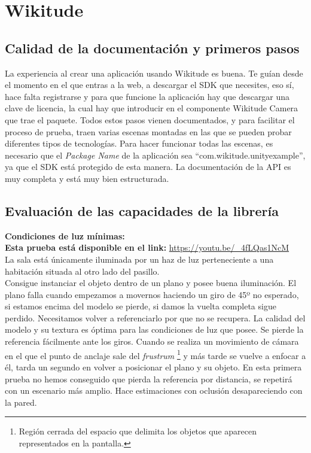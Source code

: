 \clearpage
\section{Wikitude}

\subsection{Calidad de la documentación y primeros pasos}
La experiencia al crear una aplicación usando Wikitude es buena. Te guían desde el momento en el que entras a la web, a descargar el SDK que necesites, eso sí, hace falta registrarse y para que funcione la aplicación hay que descargar una clave de licencia, la cual hay que introducir en el componente Wikitude Camera que trae el paquete. Todos estos pasos vienen documentados, y para facilitar el proceso de prueba, traen varias escenas montadas en las que se pueden probar diferentes tipos de tecnologías. Para hacer funcionar todas las escenas, es necesario que el \textit{Package Name} de la aplicación sea ``com.wikitude.unityexample'', ya que el SDK está protegido de esta manera. La documentación de la API es muy completa y está muy bien estructurada.\cite{WikitudeDoc}
\subsection{Evaluación de las capacidades de la librería}
\textbf{Condiciones de luz mínimas:}\\
\textbf{Esta prueba está disponible en el link:} \url{https://youtu.be/_4fLQas1NcM}\\

La sala está únicamente iluminada por un haz de luz perteneciente a una habitación situada al otro lado del pasillo.\\

Consigue instanciar el objeto dentro de un plano y posee buena iluminación. El plano falla cuando empezamos a movernos haciendo un giro de 45º no esperado, si estamos encima del modelo se pierde, si damos la vuelta completa sigue perdido. Necesitamos volver a referenciarlo por que no se recupera. La calidad del modelo y su textura es óptima para las condiciones de luz que posee. Se pierde la referencia fácilmente ante los giros. Cuando se realiza un movimiento de cámara en el que el punto de anclaje sale del \textit{frustrum}
\footnote{Región cerrada del espacio que delimita los objetos que aparecen representados en la pantalla.}  y más tarde se vuelve a enfocar a él, tarda un segundo en volver a posicionar el plano y su objeto. En esta primera prueba no hemos conseguido que pierda la referencia por distancia, se repetirá con un escenario más amplio. Hace estimaciones con oclusión desapareciendo con la pared.\\


